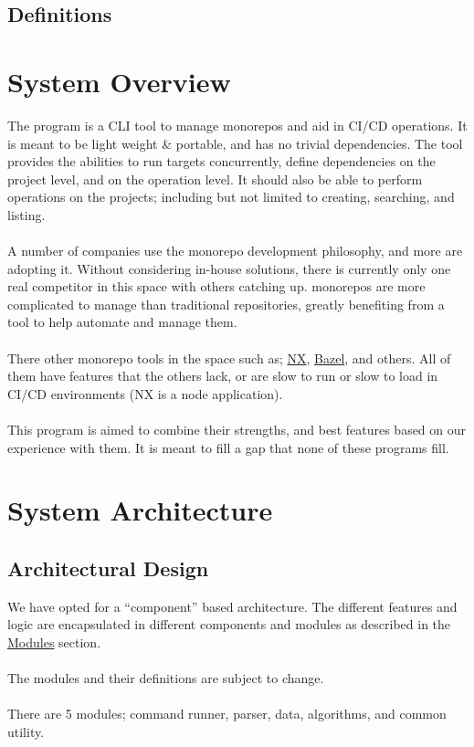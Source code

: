 \documentclass[11pt]{article}
\begin{document}
\subsection{Definitions}

\printglossary[title=\normalsize\vspace*{-1.5\baselineskip}, toctitle=]
\section{System Overview}

The program is a \Gls{CLI} tool to manage \glspl{monorepo} and aid in
\gls{CI/CD} operations. It is meant to be light weight \& portable, and has no
trivial dependencies. The tool provides the abilities to run \glspl{target}
concurrently, define dependencies on the project level, and on the operation
level. It should also be able to perform operations on the projects; including
but not limited to creating, searching, and listing.
\\\\
A number of companies use the \gls{monorepo} development philosophy, and more
are adopting it. Without considering in-house solutions, there is currently only
one real competitor in this space with others catching up. \Glspl{monorepo} are
more complicated to manage than traditional repositories, greatly benefiting
from a tool to help automate and manage them.
\\\\
There other \gls{monorepo} tools in the space such
as; \href{https://nx.dev/}{NX}, \href{https://bazel.build/}{Bazel}, and others.
All of them have features that the others lack, or are slow to run or slow to
load in \gls{CI/CD} environments (NX is a node application).
\\\\
This program is aimed to combine their strengths, and best features based on our
experience with them. It is meant to fill a gap that none of these programs fill.

\section{System Architecture}

\subsection{Architectural Design}

We have opted for a ``component'' based architecture. The different features and
logic are encapsulated in different components and modules as described in the
\hyperref[sec:modules]{Modules} section.
\\\\
The modules and their definitions are subject to change.
\\\\
There are 5 modules; command runner, parser, data, algorithms, and common
utility.
\end{document}
